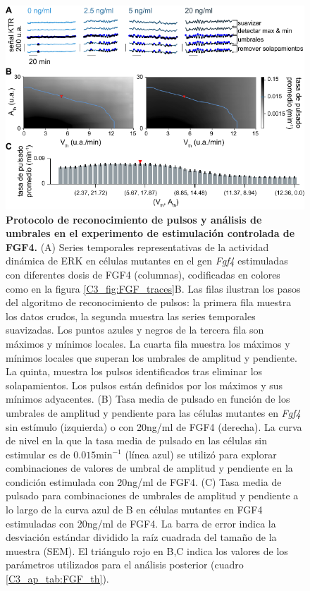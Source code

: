 \documentclass[./main.tex]{subfiles}
\begin{document}
\begin{subappendices}
\begin{figure}
    \centering
    \includegraphics[width=1\columnwidth]{figures/chapter3/C3_FGF_pulse_detection.pdf}\caption{\textbf{Protocolo de reconocimiento de pulsos y análisis de umbrales en el experimento de estimulación controlada de FGF4.} (A) Series temporales representativas de la actividad dinámica de ERK en células mutantes en el gen \textit{Fgf4} estimuladas con diferentes dosis de FGF4 (columnas), codificadas en colores como en la figura \ref{C3_fig:FGF_traces}B. Las filas ilustran los pasos del algoritmo de reconocimiento de pulsos: la primera fila muestra los datos crudos, la segunda muestra las series temporales suavizadas. Los puntos azules y negros de la tercera fila son máximos y mínimos locales. La cuarta fila muestra los máximos y mínimos locales que superan los umbrales de amplitud y pendiente. La quinta, muestra los pulsos identificados tras eliminar los solapamientos. Los pulsos están definidos por los máximos y sus mínimos adyacentes. (B) Tasa media de pulsado en función de los umbrales de amplitud y pendiente para las células mutantes en \textit{Fgf4} sin estímulo (izquierda) o con 20ng/ml de FGF4 (derecha). La curva de nivel en la que la tasa media de pulsado en las células sin estimular es de $0.015 \text{min}^{-1}$ (línea azul) se utilizó para explorar combinaciones de valores de umbral de amplitud y pendiente en la condición estimulada con 20ng/ml de FGF4. (C) Tasa media de pulsado para combinaciones de umbrales de amplitud y pendiente a lo largo de la curva azul de B en células mutantes en FGF4 estimuladas con 20ng/ml de FGF4. La barra de error indica la desviación estándar dividido la raíz cuadrada del tamaño de la muestra (SEM). El triángulo rojo en B,C indica los valores de los parámetros utilizados para el análisis posterior (cuadro \ref{C3_ap_tab:FGF_th}).}
    \label{C3_ap_fig:FGF_pulse_detection}
\end{figure}


\end{subappendices}
\end{document}
